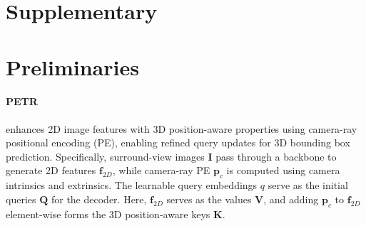 \clearpage
\appendix
\setcounter{page}{1}
{\section*{Supplementary}\huge }

\section{Preliminaries}
\label{sec:petr_preliminaries}

\paragraph{PETR} enhances 2D image features with 3D position-aware properties using camera-ray positional encoding (PE), enabling refined query updates for 3D bounding box prediction. Specifically, surround-view images $\mathbf{I}$ pass through a backbone to generate 2D features $\mathbf{f}_{2D}$, while camera-ray PE $\mathbf{p}_c$ is computed using camera intrinsics and extrinsics. The learnable query embeddings $q$ serve as the initial queries $\mathbf{Q}$ for the decoder. Here, $\mathbf{f}_{2D}$ serves as the values $\mathbf{V}$, and adding $\mathbf{p}_c$ to $\mathbf{f}_{2D}$ element-wise forms the 3D position-aware keys $\mathbf{K}$.

